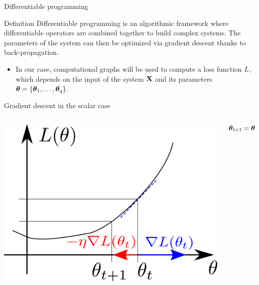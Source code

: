 \documentclass[xcolor=pdftex,dvipsnames,table,mathserif]{beamer}
\begin{document}
\begin{frame}{Differentiable programming}

\begin{block}{Definition}
  Differentiable programming is an algorithmic framework where differentiable operators are combined together to build complex systems. The parameters of the system can then be optimized via gradient descent thanks to \alert{back-propagation}.
\end{block}

\begin{itemize}
\item In our case, \alert{computational graphs} will be used to compute a \alert{loss} function $L$, which depends on the input of the system $\mathbf{X}$ and its parameters $\boldsymbol{\theta} = \{\boldsymbol{\theta}_1, \ldots, \boldsymbol{\theta}_q\}$.

\end{itemize}

\end{frame}
\begin{frame}{Gradient descent in the scalar case}

\begin{columns}
  \begin{column}{.5\textwidth}
    \includegraphics[width=\textwidth]{gradient_descent}
  \end{column}

  \begin{column}{.5\textwidth}
    \[
    \boldsymbol{\theta}_{t+1} = \boldsymbol{\theta}_t - \eta\nabla L(\boldsymbol{\theta}_t)
    \]
  \end{column}
\end{columns}

\end{frame}
\end{document}
